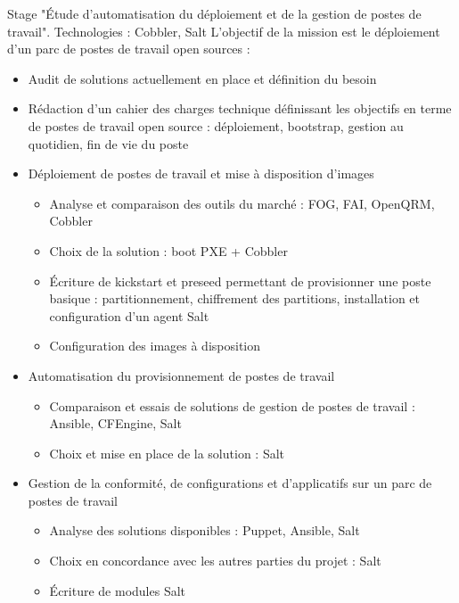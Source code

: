 \documentclass[10pt,a4paper]{../lib/moderncv/moderncv}
\begin{document}
{Stage "Étude d'automatisation du déploiement et de la gestion de postes de
  travail". Technologies : Cobbler, Salt
  L'objectif de la mission est le déploiement d'un parc de postes de travail open
  sources :
  \begin{itemize}
    \item Audit de solutions actuellement en place et définition du besoin
    \item Rédaction d'un cahier des charges technique définissant les objectifs
      en terme de postes de travail open source : déploiement, bootstrap, gestion
      au quotidien, fin de vie du poste
    \item Déploiement de postes de travail et mise à disposition d'images
      \begin{itemize}
        \item Analyse et comparaison des outils du marché : FOG, FAI, OpenQRM,
          Cobbler
        \item Choix de la solution : boot PXE + Cobbler
        \item Écriture de kickstart et preseed permettant de provisionner une
          poste basique : partitionnement, chiffrement des partitions,
          installation et configuration d'un agent Salt
        \item Configuration des images à disposition
      \end{itemize}
    \item Automatisation du provisionnement de postes de travail
      \begin{itemize}
        \item Comparaison et essais de solutions de gestion de postes de travail
          : Ansible, CFEngine, Salt
        \item Choix et mise en place de la solution : Salt
      \end{itemize}
    \item Gestion de la conformité, de configurations et d'applicatifs sur un
      parc de postes de travail
      \begin{itemize}
        \item Analyse des solutions disponibles : Puppet, Ansible, Salt
        \item Choix en concordance avec les autres parties du projet : Salt
        \item Écriture de modules Salt
      \end{itemize}

\end{itemize}}
\end{document}

